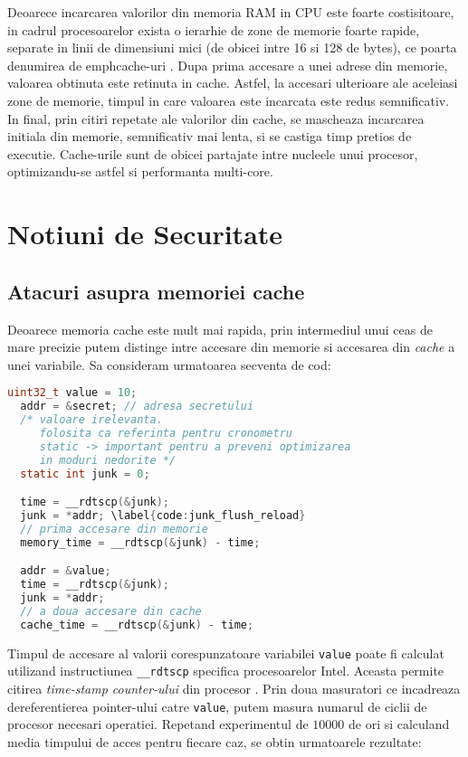 Deoarece incarcarea valorilor din memoria RAM in CPU este foarte costisitoare,
in cadrul procesoarelor exista o ierarhie de zone de memorie foarte rapide,
separate in linii de dimensiuni mici (de obicei intre 16 si 128 de bytes), ce
poarta denumirea de emph{cache-uri} \cite{caching}. Dupa prima accesare a unei
adrese din memorie, valoarea obtinuta este retinuta in cache. Astfel, la
accesari ulterioare ale aceleiasi zone de memorie, timpul in care valoarea este
incarcata este redus semnificativ. In final, prin citiri repetate ale valorilor
din cache, se mascheaza incarcarea initiala din memorie, semnificativ mai
lenta, si se castiga timp pretios de executie. Cache-urile sunt de obicei
partajate intre nucleele unui procesor, optimizandu-se astfel si performanta
multi-core.

\section{Notiuni de Securitate}

\subsection{Atacuri asupra memoriei cache}\label{sec:atacuri_cache}


Deoarece memoria cache este mult mai rapida, prin intermediul unui ceas de mare precizie
putem distinge intre accesare din memorie si accesarea din \emph{cache} a unei variabile.
Sa consideram urmatoarea secventa de cod:

\begin{lstlisting}[language=c]
  uint32_t value = 10;
  addr = &secret; // adresa secretului
  /* valoare irelevanta.
     folosita ca referinta pentru cronometru
     static -> important pentru a preveni optimizarea
     in moduri nedorite */
  static int junk = 0; 

  time = __rdtscp(&junk);
  junk = *addr; \label{code:junk_flush_reload}
  // prima accesare din memorie
  memory_time = __rdtscp(&junk) - time;

  addr = &value;
  time = __rdtscp(&junk);
  junk = *addr;
  // a doua accesare din cache
  cache_time = __rdtscp(&junk) - time;
\end{lstlisting}


Timpul de accesare al valorii corespunzatoare variabilei \texttt{value} poate
fi calculat utilizand instructiunea \texttt{\_\_rdtscp} specifica procesoarelor
Intel. Aceasta permite citirea \emph{time-stamp counter-ului} din procesor
\cite{rdtscp}. Prin doua masuratori ce incadreaza dereferentierea pointer-ului
catre \texttt{value}, putem masura numarul de ciclii de procesor necesari
operatiei. Repetand experimentul de $10000$ de ori si calculand media
timpului de acces pentru fiecare caz, se obtin urmatoarele rezultate:

